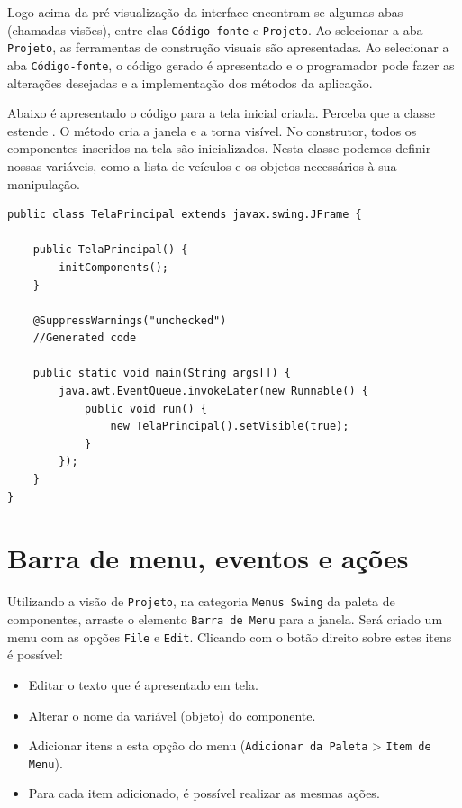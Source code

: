 Logo acima da pré-visualização da interface encontram-se algumas abas (chamadas visões), entre elas \texttt{Código-fonte} e \texttt{Projeto}. Ao selecionar a aba \texttt{Projeto}, as ferramentas de construção visuais são apresentadas. Ao selecionar a aba \texttt{Código-fonte}, o código gerado é apresentado e o programador pode fazer as alterações desejadas e a implementação dos métodos da aplicação.

Abaixo é apresentado o código para a tela inicial criada. Perceba que a classe estende . O método  cria a janela e a torna visível. No construtor, todos os componentes inseridos na tela são inicializados. Nesta classe podemos definir nossas variáveis, como a lista de veículos e os objetos necessários à sua manipulação.

\begin{verbatim}
public class TelaPrincipal extends javax.swing.JFrame {
	
	public TelaPrincipal() {
		initComponents();
	}
	
	@SuppressWarnings("unchecked") 
	//Generated code
	
	public static void main(String args[]) { 
		java.awt.EventQueue.invokeLater(new Runnable() {
			public void run() { 
				new TelaPrincipal().setVisible(true); 
			}
		});
	}
}    
\end{verbatim}
    
\section{Barra de menu, eventos e ações}

Utilizando a visão de \texttt{Projeto}, na categoria \texttt{Menus Swing} da paleta de componentes, arraste o elemento \texttt{Barra de Menu} para a janela. Será criado um menu com as opções \texttt{File} e \texttt{Edit}. Clicando com o botão direito sobre estes itens é possível:

\begin{itemize}
	\item Editar o texto que é apresentado em tela.
	\item Alterar o nome da variável (objeto) do componente.
	\item Adicionar itens a esta opção do menu (\texttt{Adicionar da Paleta} > \texttt{Item de Menu}).
	\item Para cada item adicionado, é possível realizar as mesmas ações.
\end{itemize}

